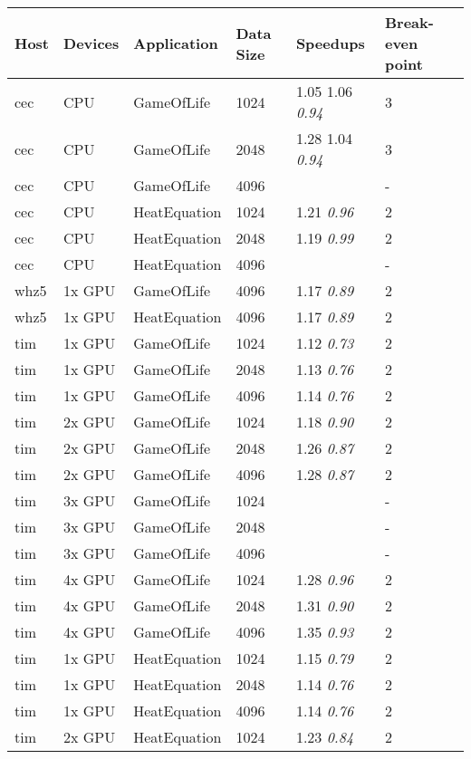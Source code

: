 \begin{tabular}{| l | l | l | l | l | l |}
\hline
\textbf{Host} & \textbf{Devices} & \textbf{Application} & \textbf{Data Size} & \textbf{Speedups} & \textbf{Break-even point}\\
\hline
cec & CPU & GameOfLife & 1024 & 1.05 1.06 \textit{0.94} & 3 \\
cec & CPU & GameOfLife & 2048 & 1.28 1.04 \textit{0.94} & 3 \\
cec & CPU & GameOfLife & 4096 &  & - \\
cec & CPU & HeatEquation & 1024 & 1.21 \textit{0.96} & 2 \\
cec & CPU & HeatEquation & 2048 & 1.19 \textit{0.99} & 2 \\
cec & CPU & HeatEquation & 4096 &  & - \\
whz5 & 1x GPU & GameOfLife & 4096 & 1.17 \textit{0.89} & 2 \\
whz5 & 1x GPU & HeatEquation & 4096 & 1.17 \textit{0.89} & 2 \\
tim & 1x GPU & GameOfLife & 1024 & 1.12 \textit{0.73} & 2 \\
tim & 1x GPU & GameOfLife & 2048 & 1.13 \textit{0.76} & 2 \\
tim & 1x GPU & GameOfLife & 4096 & 1.14 \textit{0.76} & 2 \\
tim & 2x GPU & GameOfLife & 1024 & 1.18 \textit{0.90} & 2 \\
tim & 2x GPU & GameOfLife & 2048 & 1.26 \textit{0.87} & 2 \\
tim & 2x GPU & GameOfLife & 4096 & 1.28 \textit{0.87} & 2 \\
tim & 3x GPU & GameOfLife & 1024 &  & - \\
tim & 3x GPU & GameOfLife & 2048 &  & - \\
tim & 3x GPU & GameOfLife & 4096 &  & - \\
tim & 4x GPU & GameOfLife & 1024 & 1.28 \textit{0.96} & 2 \\
tim & 4x GPU & GameOfLife & 2048 & 1.31 \textit{0.90} & 2 \\
tim & 4x GPU & GameOfLife & 4096 & 1.35 \textit{0.93} & 2 \\
tim & 1x GPU & HeatEquation & 1024 & 1.15 \textit{0.79} & 2 \\
tim & 1x GPU & HeatEquation & 2048 & 1.14 \textit{0.76} & 2 \\
tim & 1x GPU & HeatEquation & 4096 & 1.14 \textit{0.76} & 2 \\
tim & 2x GPU & HeatEquation & 1024 & 1.23 \textit{0.84} & 2 \\

\end{tabular}
